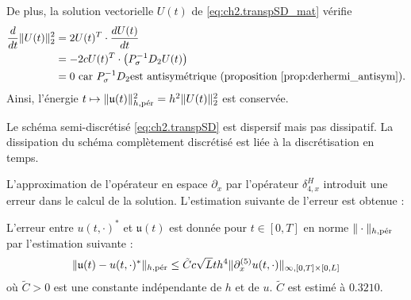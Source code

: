 De plus, la solution vectorielle $U(t)$ de \eqref{eq:ch2.transpSD_mat} vérifie
\begin{align*}
\dfrac{d}{dt} \| U(t) \|_2^2 & = 2 U(t)^T \cdot \dfrac{d U(t)}{dt} \\
	& = - 2 c U(t)^T \cdot \left( P_{\sigma}^{-1}D_2 U(t) \right) \\
	& = 0 \text{ car } P_{\sigma}^{-1}D_2 \text{est antisymétrique (proposition \ref{prop:derhermi_antisym})}.
\end{align*}
Ainsi, l'énergie $t \mapsto \| \mathfrak{u}(t) \|_{h,\per}^2 = h^2 \| U(t) \|_2^2$ est conservée.

Le schéma semi-discrétisé \eqref{eq:ch2.transpSD} est dispersif mais pas dissipatif. La dissipation du schéma complètement discrétisé est liée à la discrétisation en temps.

L'approximation de l'opérateur en espace $\partial_x$ par l'opérateur $\delta_{4,x}^H$ introduit une erreur dans le calcul de la solution. L'estimation suivante de l'erreur est obtenue :
\begin{proposition}
L'erreur entre $u(t,\cdot)^*$ et $\mathfrak{u}(t)$ est donnée pour $t \in [0,T]$ en norme $\| \cdot \|_{h,\per}$ par l'estimation suivante :
\begin{equation}
\| \mathfrak{u}(t) - u(t,\cdot)^* \|_{h,\per} \leq \tilde{C} c \sqrt{L} t h^4 \| \partial_x^{(5)} u(t,\cdot) \|_{\infty,[0,T] \times [0,L]}
\end{equation}
où $\tilde{C}>0$ est une constante indépendante de $h$ et de $u$. $\tilde{C}$ est estimé à $0.3210$.
\label{prop:consistance_h_trsp}
\end{proposition}

